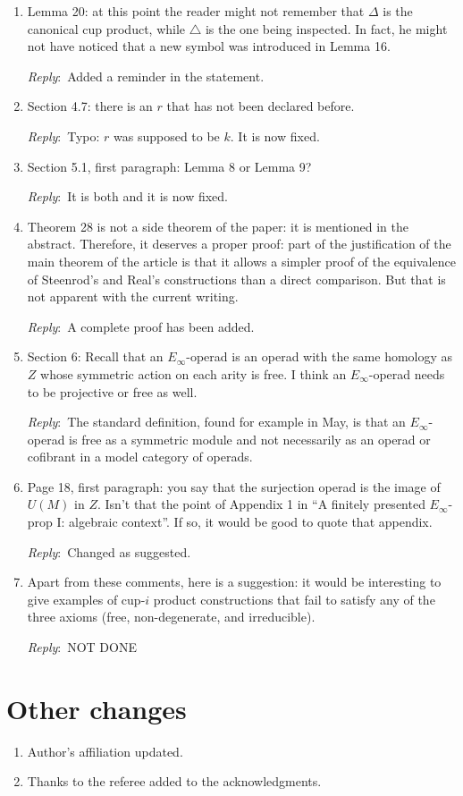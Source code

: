 \documentclass{amsart}
\newcommand{\ar}{\medskip\noindent\textit{Reply}:\ }
\begin{document}
\begin{enumerate}
		\item Lemma 20: at this point the reader might not remember that \(\Delta\) is the canonical cup product, while \(\triangle\) is the one being inspected. In fact, he might not have noticed that a new symbol was introduced in Lemma 16.

		\ar Added a reminder in the statement.

		\item Section 4.7: there is an \(r\) that has not been declared before.

		\ar Typo: $r$ was supposed to be $k$. It is now fixed.

		\item Section 5.1, first paragraph: Lemma 8 or Lemma 9?

		\ar It is both and it is now fixed.

		\item Theorem 28 is not a side theorem of the paper: it is mentioned in the abstract. Therefore, it deserves a proper proof: part of the justification of the main theorem of the article is that it allows a simpler proof of the equivalence of Steenrod’s and Real’s constructions than a direct comparison. But that is not apparent with the current writing.

		\ar A complete proof has been added.

		\item Section 6: Recall that an \(E_\infty\)-operad is an operad with the same homology as \(Z\) whose symmetric action on each arity is free. I think an \(E_\infty\)-operad needs to be projective or free as well.

		\ar The standard definition, found for example in May, is that an $E_\infty$-operad is free as a symmetric module and not necessarily as an operad or cofibrant in a model category of operads.

		\item Page 18, first paragraph: you say that the surjection operad is the image of \(U(M)\) in \(Z\).
		Isn’t that the point of Appendix 1 in “A finitely presented \(E_\infty\)-prop I: algebraic context”. If so, it would be good to quote that appendix.

		\ar Changed as suggested.

		\item Apart from these comments, here is a suggestion: it would be interesting to give examples of cup-\(i\) product constructions that fail to satisfy any of the three axioms (free, non-degenerate, and irreducible).

		\ar NOT DONE
	\end{enumerate}

	\section{Other changes}

	\begin{enumerate}
		\item Author's affiliation updated.
		\item Thanks to the referee added to the acknowledgments.
	\end{enumerate}
\end{document}
